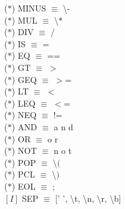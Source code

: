\documentclass[\main/MemoriaPL.tex]{subfiles}
\begin{document}
    \vspace{2mm}
    \hspace{5mm}($\ast$) MINUS $\equiv$ \textbackslash - \\
    \vspace{2mm}
    \hspace{5mm}($\ast$) MUL $\equiv$ \textbackslash $\ast$ \\
    \vspace{2mm}
    \hspace{5mm}($\ast$) DIV $\equiv$ / \\
    \vspace{2mm}
    \hspace{5mm}($\ast$) IS $\equiv$ = \\
    \vspace{2mm}
    \hspace{5mm}($\ast$) EQ $\equiv$ == \\
    \vspace{2mm}
    \hspace{5mm}($\ast$) GT $\equiv$ $>$ \\
    \vspace{2mm}
    \hspace{5mm}($\ast$) GEQ $\equiv$ $>$= \\
    \vspace{2mm}
    \hspace{5mm}($\ast$) LT $\equiv$ $<$ \\
    \vspace{2mm}
    \hspace{5mm}($\ast$) LEQ $\equiv$ $<$= \\
    \vspace{2mm}
    \hspace{5mm}($\ast$) NEQ $\equiv$ != \\
    \vspace{2mm}
    \hspace{5mm}($\ast$) AND $\equiv$ a n d \\
    \vspace{2mm}
    \hspace{5mm}($\ast$) OR $\equiv$ o r \\
    \vspace{2mm}
    \hspace{5mm}($\ast$) NOT $\equiv$ n o t \\
    \vspace{2mm}
    \hspace{5mm}($\ast$) POP $\equiv$ \textbackslash $($ \\
    \vspace{2mm}
    \hspace{5mm}($\ast$) PCL $\equiv$ \textbackslash $)$ \\
    \vspace{2mm}
    \hspace{5mm}($\ast$) EOL $\equiv$ ;\\
    \vspace{2mm}
    \hspace{5mm}$[I]$ SEP $\equiv$ $[$' ', \textbackslash t, \textbackslash n, \textbackslash r, \textbackslash b] \\
\end{document}
